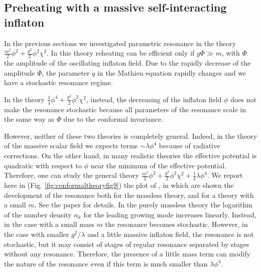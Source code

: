 \documentclass[11pt,a4paper,twoside]{book}
\begin{document}
\subsection{Preheating with a massive self-interacting inflaton}
In the previous sections we investigated parametric resonance in the theory $ \frac{m^{2}}{2}\phi^{2} + \frac{g^{2}}{2}\phi^{2}\chi^{2} $. In this theory reheating can be efficient only if $ g\Phi \gg m $, with $\Phi$ the amplitude of the oscillating inflaton field. Due to the rapidly decrease of the amplitude $\Phi$, the parameter $ q $ in the Mathieu equation rapidly changes and we have a stochastic resonance regime.

In the theory $ \frac{\lambda}{4}\phi^{4} + \frac{g^{2}}{2}\phi^{2}\chi^{2} $, instead, the decreasing of the inflaton field $\phi$ does not make the resonance stochastic because all parameters of the resonance scale in the same way as $\Phi$ due to the conformal invariance.

However, neither of these two theories is completely general. Indeed, in the theory of the massive scalar field we expects terms $\sim \lambda \phi^{4}$ because of radiative corrections. On the other hand, in many realistic theories the effective potential is quadratic with respect to $\phi$ near the minimum of the effective potential. Therefore, one can study the general theory  $\frac{m^{2}}{2}\phi^{2} + \frac{g^{2}}{2}\phi^{2}\chi^{2} +\frac{1}{4} \lambda \phi^{4} $. We report here in (Fig. \ref{fig:conformaltheoryfig9}) the plot of \cite{Chap4:ModelLambdaPhi4Reference}, in which are shown the development of the resonance both for the massless theory, and for a theory with a small $ m $. See the paper for details. In the purely massless theory the logarithm of the number density $ n_{k} $ for the leading growing mode increases linearly. Instead, in the case with a small mass $ m $ the resonance becomes stochastic. However, in the case with smaller $ g^{2}/\lambda $  and a little massive inflaton field, the resonance is not stochastic, but it may consist of stages of regular resonance separated by stages without any resonance. Therefore, the presence of a little mass term can modify the nature of the resonance even if this term is much smaller than $ \lambda \phi^{4} $.
\end{document}
